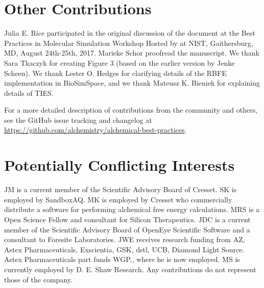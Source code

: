 \documentclass[9pt,bestpractices]{livecoms}
\newcommand{\githubrepository}{\url{https://github.com/alchemistry/alchemical-best-practices}} %
\begin{document}
\section*{Other Contributions}
%
Julia E. Rice participated in the original discussion of the document at the Best Practices in Molecular Simulation Workshop Hosted by at NIST, Gaithersburg, MD, August 24th-25th, 2017.
Marieke Schor proofread the manuscript. 
We thank Sara Tkaczyk for creating Figure 3 (based on the earlier version by Jenke Scheen).
We thank Lester O. Hedges for clarifying details of the RBFE implementation in BioSimSpace, and we thank Mateusz K. Bieniek for explaining details of TIES.


For a more detailed description of contributions from the community and others, 
see the GitHub issue tracking and changelog at \githubrepository.


\section*{Potentially Conflicting Interests}
JM is a current member of the Scientific Advisory Board of Cresset. 
SK is employed by SandboxAQ.
MK is employed by Cresset who commercially distribute a software for performing alchemical free energy calculations. MRS is a Open Science Fellow and consultant for Silicon Therapeutics.
JDC is a current member of the Scientific Advisory Board of OpenEye Scientific Software and a consultant to Foresite Laboratories.
JWE receives research funding from AZ, Astex Pharmaceuticals, Exscientia, GSK, dstl, UCB, Diamond Light Source. Astex Pharmaceuticals part funds WGP., where he is now employed.
MS is currently employed by D. E. Shaw Research. Any contributions do not represent those of the company. 
\end{document}

